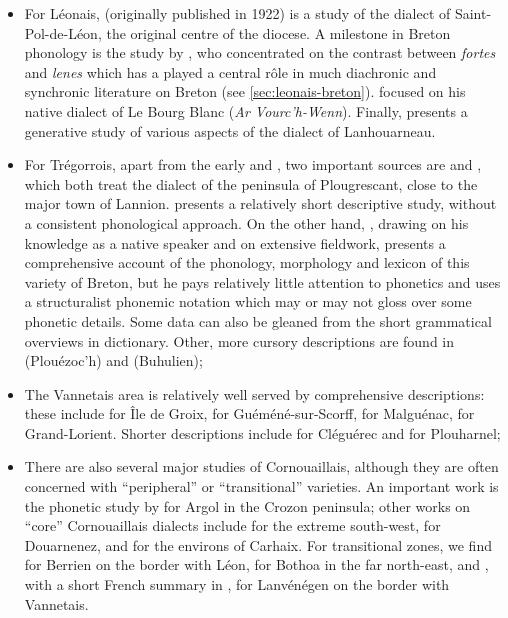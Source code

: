 \begin{itemize}
\item For Léonais, \citet{st-pol-de-leon} (originally published in 1922) is a study of the dialect of Saint-Pol-de-Léon, the original centre of the diocese. A milestone in Breton phonology is the study by \citet{falchun}, who concentrated on the contrast between \emph{fortes} and \emph{lenes} which has a played a central rôle in much diachronic and synchronic literature on Breton (see \cref{sec:leonais-breton}). \citet{falchun} focused on his native dialect of Le Bourg Blanc (\emph{Ar Vourc'h-Wenn}). Finally, \citet{carlyle88:_breton} presents a generative study of various aspects of the dialect of Lanhouarneau.
\item For Trégorrois, apart from the early \citet{botsorhel} and \citet{le08:_gramm_treguier}, two important sources are \citet{plougrescant} and \citet{le78:_le_ploug}, which both treat the dialect of the peninsula of Plougrescant, close to the major town of Lannion. \citet{plougrescant} presents a relatively short descriptive study, without a consistent phonological approach. On the other hand, \citet{le78:_le_ploug}, drawing on his knowledge as a native speaker and on extensive fieldwork, presents a comprehensive account of the phonology, morphology and lexicon of this variety of Breton, but he pays relatively little attention to phonetics and uses a structuralist phonemic notation which may or may not gloss over some phonetic details. Some data can also be gleaned from the short grammatical overviews in  dictionary. Other, more cursory descriptions are found in \citet{sommerfelt62:_notes_dourd_plouez_finis} (Plouézoc'h) and \citet{dressler73:_alleg_lentor} (Buhulien);
\item The Vannetais area is relatively well served by comprehensive descriptions: these include \citet{Ter70} for Île de Groix, \citet{mckenna} for Guéméné\hyp sur\hyp Scorff, \citet{le00:_le_malguen,le08:_etude} for Malguénac, \citet{cheveau,cheveau07:_approc_grand_lorien} for Grand\hyp Lorient. Shorter descriptions include \citet{thibault14:_notes_cleguer_morbih} for Cléguérec and \citet{plouharnel} for Plouharnel;
\item There are also several major studies of Cornouaillais, although they are often concerned with \enquote{peripheral} or \enquote{transitional} varieties. An important work is the phonetic study by \citet{Bot82} for Argol in the Crozon peninsula; other works on \enquote{core} Cornouaillais dialects include \citet{dressler80:_etudes,sinou99:_le_lechiag,sinou00:_brezh_lechiag} for the extreme south-west, \citet{denez77:_descr_douar} for Douarnenez, and \citet{timm84:_carhais_breton,favereau84:_langue_poull,wmffre99:_centr_breton} for the environs of Carhaix. For transitional zones, we find \citet{ploneis} for Berrien on the border with Léon, \citet{humphreys,humphreys95:_phonol_bothoa_saint_nicol_pelem} for Bothoa in the far north-east, and \citet{evenou87:_studi_lanij_faouet_kernev}, with a short French summary in \citet{evenou89:_descr_lanven}, for Lanvénégen on the border with Vannetais.
\end{itemize}


